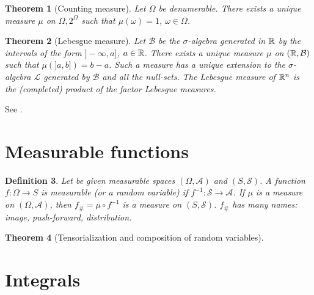 \documentclass[12pt,a4paper]{amsart}
\theoremstyle{plain}
\newtheorem{theorem}{Theorem}%
\newtheorem{definition}[theorem]{Definition}%
\theoremstyle{definition}
\theoremstyle{remark}
\begin{document}
\begin{theorem}[Counting measure] Let $\Omega$ be denumerable. There
  exists a unique measure $\mu$ on $\Omega,2^\Omega$ such that
  $\mu(\omega) = 1$, $\omega \in \Omega$.
\end{theorem}

\begin{theorem}[Lebesgue measure] Let $\mathcal B$ be the
  $\sigma$-algebra generated in $\mathbb{R}$ by the intervals of the form
  $]-\infty,a]$, $a\in\mathbb{R}$. There exists a unique measure $\mu$ on
  $(\mathbb{R},\mathcal B)$ such that $\mu(]a,b])=b-a$. Such a measure has
  a unique extension to the $\sigma$-algebra $\mathcal L$ generated by
  $\mathcal B$ and all the null-sets. The Lebesgue measure of
  $\mathbb{R}^n$ is the (completed) product of the factor Lebesgue measures.
\end{theorem}
See \cite[Th. 2.20]{rudin:1987-3rd}.

\section{Measurable functions}
\label{sec:measurable-functions}

\begin{definition}
  Let be given measurable spaces $(\Omega,\mathcal A)$ and
  $(S,\mathcal S)$. A function $f \colon \Omega \to S$ is \emph{measurable}
  (or a \emph{random variable}) if $f^{-1} \colon \mathcal S \to
  \mathcal A$. If $\mu$ is a measure on $(\Omega,\mathcal A)$, then
  $f_\# = \mu \circ f^{-1}$ is a measure on $(S,\mathcal S)$. $f_\#$ has many names: \emph{image}, \emph{push-forward},
\emph{distribution}.
\end{definition}


\begin{theorem}[Tensorialization and composition of random variables]
\end{theorem}
\section{Integrals}
\label{sec:integrals}



\end{document}
